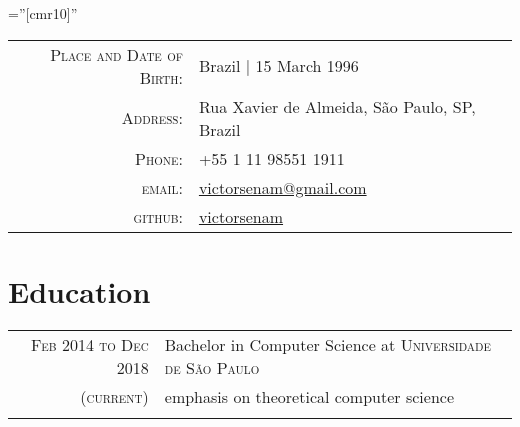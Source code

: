 \documentclass[a4paper,10pt]{article} %
\begin{document}
\pagestyle{empty} %

\font\fb=''[cmr10]'' %


\par{\bigskip\par} %


\begin{tabular}{rl}
\textsc{Place and Date of Birth:} & Brazil | 15 March 1996 \\
\textsc{Address:} & Rua Xavier de Almeida, São Paulo, SP, Brazil \\
\textsc{Phone:} & +55 1 11 98551 1911\\
\textsc{email:} & \href{mailto:victorsenam@gmail.com}{victorsenam@gmail.com} \\
\textsc{github:} & \href{https://github.com/victorsenam}{victorsenam} \\
\end{tabular}


\section{Education}

\begin{tabular}{r|p{11cm}}
\textsc{Feb 2014 to Dec 2018}   & Bachelor in Computer Science at \textsc{Universidade de São Paulo}\\
\textsc{(current)}              & \footnotesize{emphasis on theoretical computer science} \\
\multicolumn{2}{c}{} \\
\end{tabular}


\end{document}
